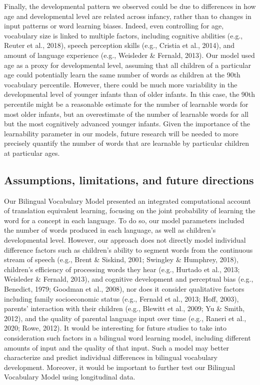 \documentclass[
  english,
  ,man,floatsintext]{apa6}
\begin{document}
Finally, the developmental pattern we observed could be due to differences in how age and developmental level are related across infancy, rather than to changes in input patterns or word learning biases. Indeed, even controlling for age, vocabulary size is linked to multiple factors, including cognitive abilities (e.g., Reuter et al., 2018), speech perception skills (e.g., Cristia et al., 2014), and amount of language experience (e.g., Weisleder \& Fernald, 2013). Our model used age as a proxy for developmental level, assuming that all children of a particular age could potentially learn the same number of words as children at the 90th vocabulary percentile. However, there could be much more variability in the developmental level of younger infants than of older infants. In this case, the 90th percentile might be a reasonable estimate for the number of learnable words for most older infants, but an overestimate of the number of learnable words for all but the most cognitively advanced younger infants. Given the importance of the learnability parameter in our models, future research will be needed to more precisely quantify the number of words that are learnable by particular children at particular ages.

\hypertarget{assumptions-limitations-and-future-directions}{%
\subsection{Assumptions, limitations, and future directions}\label{assumptions-limitations-and-future-directions}}

Our Bilingual Vocabulary Model presented an integrated computational account of translation equivalent learning, focusing on the joint probability of learning the word for a concept in each language. To do so, our model parameters included the number of words produced in each language, as well as children's developmental level. However, our approach does not directly model individual difference factors such as children's ability to segment words from the continuous stream of speech (e.g., Brent \& Siskind, 2001; Swingley \& Humphrey, 2018), children's efficiency of processing words they hear (e.g., Hurtado et al., 2013; Weisleder \& Fernald, 2013), and cognitive development and perceptual bias (e.g., Benedict, 1979; Goodman et al., 2008), nor does it consider qualitative factors including family socioeconomic status (e.g., Fernald et al., 2013; Hoff, 2003), parents' interaction with their children (e.g., Blewitt et al., 2009; Yu \& Smith, 2012), and the quality of parental language input over time (e.g., Raneri et al., 2020; Rowe, 2012). It would be interesting for future studies to take into consideration such factors in a bilingual word learning model, including different amounts of input and the quality of that input. Such a model may better characterize and predict individual differences in bilingual vocabulary development. Moreover, it would be important to further test our Bilingual Vocabulary Model using longitudinal data.
\end{document}
